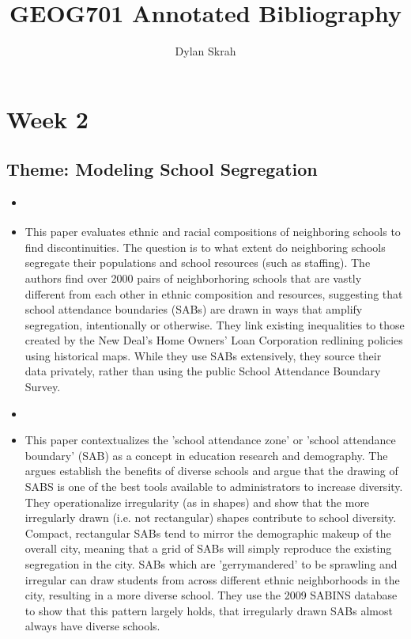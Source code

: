\documentclass{article} \usepackage{filecontents}
\begin{document}
\title{GEOG701 Annotated Bibliography} \author{Dylan Skrah}

\maketitle

 

\section{Week 2}
\subsection{Theme: Modeling School Segregation}
\begin{itemize}

\item \cite{monarrez2021RaciallyUnequal} \subitem
\item This paper evaluates ethnic and racial compositions of
  neighboring schools to find discontinuities. The question is to what
  extent do neighboring schools segregate their populations and school
  resources (such as staffing). The authors find over 2000 pairs of
  neighborhoring schools that are vastly different from each other in
  ethnic composition and resources, suggesting that school attendance
  boundaries (SABs) are drawn in ways that amplify segregation,
  intentionally or otherwise. They link existing inequalities to those
  created by the New Deal's Home Owners' Loan Corporation redlining
  policies using historical maps. While they use SABs extensively,
  they source their data privately, rather than using the public
  School Attendance Boundary Survey.

\item \cite{saporito2016IrregularlyShaped}
\item This paper contextualizes the 'school attendance zone' or
  'school attendance boundary' (SAB) as a concept in education
  research and demography. The argues establish the benefits of
  diverse schools and argue that the drawing of SABS is one of the
  best tools available to administrators to increase diversity. They
  operationalize irregularity (as in shapes) and show that the more
  irregularly drawn (i.e. not rectangular) shapes contribute to school
  diversity. Compact, rectangular SABs tend to mirror the demographic
  makeup of the overall city, meaning that a grid of SABs will simply
  reproduce the existing segregation in the city. SABs which are
  'gerrymandered' to be sprawling and irregular can draw students from
  across different ethnic neighborhoods in the city, resulting in a
  more diverse school. They use the 2009 SABINS database to show that
  this pattern largely holds, that irregularly drawn SABs almost
  always have diverse schools.

\end{itemize}
\end{document}
